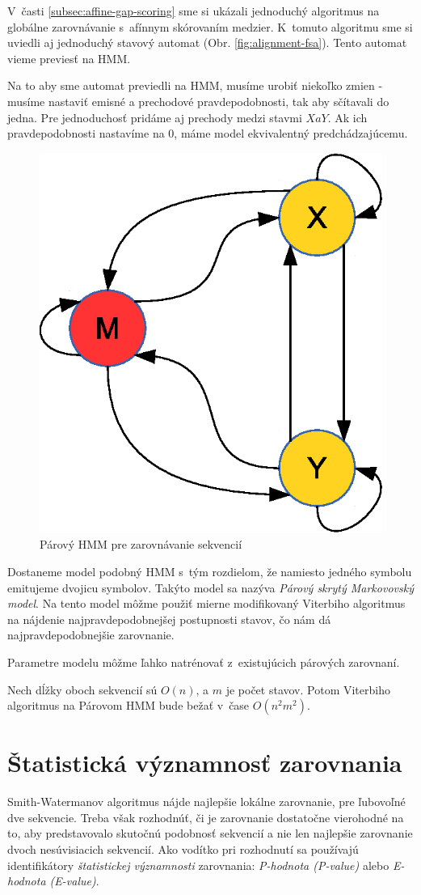 V~časti \ref{subsec:affine-gap-scoring} sme si ukázali jednoduchý algoritmus na globálne zarovnávanie s~afínnym skórovaním medzier. K~tomuto algoritmu sme si uviedli aj jednoduchý stavový automat (Obr. \ref{fig:alignment-fsa}). Tento automat vieme previesť na HMM.

Na to aby sme automat previedli na HMM, musíme urobiť niekoľko zmien - musíme nastaviť emisné a prechodové pravdepodobnosti, tak aby sčítavali do jedna. Pre jednoduchosť pridáme aj prechody medzi stavmi $X a Y$. Ak ich pravdepodobnosti nastavíme na 0, máme model ekvivalentný predchádzajúcemu.

\begin{figure}[htp]
    \centering
    \includegraphics[width=.4\textwidth]{images/simple_model}
    \caption{Párový HMM pre zarovnávanie sekvencií}
    \label{fig:simple-model}
\end{figure}

Dostaneme model podobný HMM s~tým rozdielom, že namiesto jedného symbolu emitujeme dvojicu symbolov. Takýto model sa nazýva \textit{Párový skrytý Markovovský model}. Na tento model môžme použiť mierne modifikovaný Viterbiho algoritmus na nájdenie najpravdepodobnejšej postupnosti stavov, čo nám dá najpravdepodobnejšie zarovnanie.

Parametre modelu môžme ľahko natrénovať z~existujúcich párových zarovnaní.

Nech dĺžky oboch sekvencií sú $O(n)$, a $m$ je počet stavov. Potom Viterbiho algoritmus na Párovom HMM bude bežať v~čase $O(n^2m^2)$.
\cite{durbin}

\section[Štat. významnosť ]{Štatistická významnosť zarovnania}
Smith-Watermanov algoritmus nájde najlepšie lokálne zarovnanie, pre ľubovoľné dve sekvencie. Treba však rozhodnúť, či je zarovnanie dostatočne vierohodné na to, aby predstavovalo skutočnú podobnosť sekvencií a nie len najlepšie zarovnanie dvoch nesúvisiacich sekvencií.
Ako vodítko pri rozhodnutí sa používajú identifikátory \textit{štatistickej významnosti} zarovnania: \textit{P-hodnota (P-value)} alebo \textit{E-hodnota (E-value)}.

